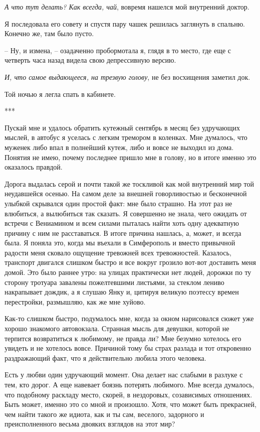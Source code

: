 \documentclass[
]{book}
\begin{document}
\emph{А что тут делать? Как всегда, чай}, вовремя нашелся мой внутренний доктор.

Я последовала его совету и спустя пару чашек решилась заглянуть в спальню. Конечно же, там было пусто.

-- Ну, и измена, -- озадаченно пробормотала я, глядя в то место, где еще с четверть часа назад видела свою депрессивную версию.

\emph{И, что самое выдающееся, на трезвую голову}, не без восхищения заметил док.

Той ночью я легла спать в кабинете.

***

Пускай мне и удалось обратить кутежный сентябрь в месяц без удручающих мыслей, в автобус я уселась с легким тремором в коленках. Мне думалось, что муженек либо впал в полнейший кутеж, либо и вовсе не выходил из дома. Понятия не имею, почему последнее пришло мне в голову, но в итоге именно это оказалось правдой.

Дорога выдалась серой и почти такой же тоскливой как мой внутренний мир той неудавшейся осенью. На самом деле за внешней говорливостью и бесконечной улыбкой скрывался один простой факт: мне было страшно. На этот раз не влюбиться, а вылюбиться так сказать. Я совершенно не знала, чего ожидать от встречи с Вениамином и всем силами пыталась найти хоть одну адекватную причину с ним не расставаться. В итоге причина нашлась, а, может, и всегда была. Я поняла это, когда мы въехали в Симферополь и вместо привычной радости меня сковало ощущение тревожней всех тревожностей. Казалось, транспорт двигался слишком быстро и все вокруг грозило вот-вот доставить меня домой. Это было раннее утро: на улицах практически нет людей, дорожки по ту сторону тротуара завалены пожелтевшими листьями, за стеклом лениво накрапывает дождик, а я слушаю Янку и, цитируя великую поэтессу времен перестройки, размышляю, как же мне хуйово.

Как-то слишком быстро, подумалось мне, когда за окном нарисовался сюжет уже хорошо знакомого автовокзала. Странная мысль для девушки, которой не терпится возвратиться к любимому, не правда ли? Мне безумно хотелось его увидеть и не хотелось вовсе. Причиной тому бы страх разлада и тот откровенно раздражающий факт, что я действительно любила этого человека.

Есть у любви один удручающий момент. Она делает нас слабыми в разлуке с тем, кто дорог. А еще навевает боязнь потерять любимого. Мне всегда думалось, что подобному раскладу место, скорей, в нездоровых, созависимых отношениях. Быть может, именно это со мной и произошло. Хотя, что может быть прекрасней, чем найти такого же идиота, как и ты сам, веселого, задорного и преисполненного весьма двояких взглядов на этот мир?
\end{document}

